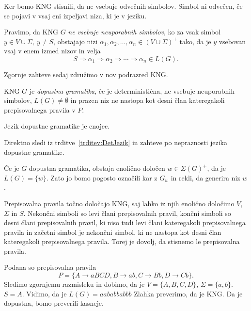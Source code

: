 \documentclass[fin1, tisk]{fmfdelo}
\theoremstyle{definition}
\begin{document}
Ker bomo KNG stisnili, da ne vsebuje odvečnih simbolov. Simbol ni odvečen, če se pojavi v vsaj 
eni izpeljavi niza, ki je v jeziku. 

\begin{definicija}
    Pravimo, da KNG $G$ \emph{ne vsebuje neuporabnih simbolov}, 
    ko za vsak simbol $ y \in V \cup \Sigma, \ y \neq S $, obstajajo nizi
    $ \alpha_1, \alpha_2, \ldots, \alpha_n \in (V \cup \Sigma)^+ $ tako, da je $y$ vsebovan vsaj
    v enem izmed nizov in velja
    \[
        S \Rightarrow \alpha_1 \Rightarrow \alpha_2 \Rightarrow \cdots \Rightarrow \alpha_n \in L(G).
    \]
\end{definicija}

Zgornje zahteve sedaj združimo v nov podrazred KNG. 

\begin{definicija}
    KNG $G$ je \emph{dopustna gramatika}, če je deterministična, ne vsebuje neuporabnih simbolov,
    $ L(G) \neq \emptyset $ in prazen niz ne nastopa kot desni član kateregakoli prepisovalnega 
    pravila v $ P $.
\end{definicija}

\begin{posledica}
    Jezik dopustne gramatike je enojec. 
\end{posledica}

\begin{dokaz}
    Direktno sledi iz trditve~\ref{trditev:DetJezik} in zahteve po nepraznosti jezika dopustne 
    gramatike.
\end{dokaz}

Če je $G$ dopustna gramatika, obstaja enolično določen $w \in \Sigma(G)^+$, da je
$L(G) = \{ w \}$. Zato jo bomo pogosto označili kar z $G_w$ in rekli, da generira niz $w$.

Prepisovalna pravila točno določajo KNG, saj lahko iz njih enolično določimo $V$, $\Sigma$ in $S$.
Nekončni simboli so levi člani prepisovalnih pravil, končni simboli so desni člani prepisovalnih
pravil, ki niso tudi levi člani kateregakoli prepisovalnega pravila in začetni simbol je nekončni
simbol, ki ne nastopa kot desni član kateregakoli prepisovalnega pravila. Torej je dovolj, da 
stisnemo le prepisovalna pravila.

\begin{primer}\label{primer:dopustna}
    Podana so prepisovalna pravila
    \[
        P = \{ A \rightarrow \mathit{aBCD}, B \rightarrow \mathit{ab}, C \rightarrow 
        \mathit{Bb}, D \rightarrow \mathit{Cb} \}.
    \]
    Sledimo zgornjemu razmisleku in dobimo, da je $V = \{ A, B, C, D \}$, $\Sigma = \{ a, b \}$.
    $S = A$. Vidimo, da je $L(G) = \mathit{aababbabbb}$ Zlahka preverimo, da je KNG. Da je dopustna,
    bomo preverili kasneje.
\end{primer}
\end{document}
